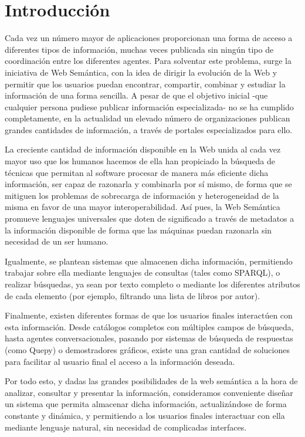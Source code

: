 \documentclass[a4paper,11pt]{report}
\begin{document}
\chapter*{Introducción}\vspace{-1ex}

Cada vez un número mayor de aplicaciones proporcionan una forma de acceso a diferentes tipos de información, muchas veces publicada sin ningún tipo de coordinación entre los diferentes agentes. Para solventar este problema, surge la iniciativa de Web Semántica\cite{webs}, con la idea de dirigir la evolución de la Web y permitir que los usuarios puedan encontrar, compartir, combinar y estudiar la información de una forma sencilla. A pesar de que el objetivo inicial -que cualquier persona pudiese publicar información especializada- no se ha cumplido completamente, en la actualidad un elevado número de organizaciones publican grandes cantidades de información, a través de portales especializados para ello.

La creciente cantidad de información disponible en la Web unida al cada vez mayor uso que los humanos hacemos de ella han propiciado la búsqueda de técnicas que permitan al software procesar de manera más eficiente dicha información, ser capaz de razonarla y combinarla por sí mismo, de forma que se mitiguen los problemas de sobrecarga de información y heterogeneidad de la misma en favor de una mayor interoperabilidad. Así pues, la Web Semántica promueve lenguajes universales\cite{rdf} que doten de significado a través de metadatos a la información disponible de forma que las máquinas puedan razonarla sin necesidad de un ser humano.

Igualmente, se plantean sistemas que almacenen dicha información, permitiendo trabajar sobre ella mediante lenguajes de consultas (tales como SPARQL), o realizar búsquedas, ya sean por texto completo o mediante los diferentes atributos de cada elemento (por ejemplo, filtrando una lista de libros por autor).

Finalmente, existen diferentes formas de que los usuarios finales interactúen con esta información. Desde catálogos completos con múltiples campos de búsqueda, hasta agentes conversacionales, pasando por sistemas de búsqueda de respuestas (como Quepy\cite{quepy}) o demostradores gráficos, existe una gran cantidad de soluciones para facilitar al usuario final el acceso a la información deseada.

Por todo esto, y dadas las grandes posibilidades de la web semántica a la hora de analizar, consultar y presentar la información, consideramos conveniente diseñar un sistema que permita almacenar dicha información, actualizándose de forma constante y dinámica, y permitiendo a los usuarios finales interactuar con ella mediante lenguaje natural, sin necesidad de complicadas interfaces.
\end{document}
